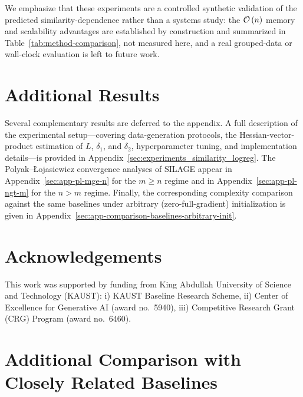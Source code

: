 \documentclass{article}
\newcommand{\cO}{{\cal O}}
\newcommand{\rb}[1]{\left(#1\right)}
\theoremstyle{plain}
\newcommand{\algname}[1]{{\sf\scalefont{0.88}\color{mydarkgreen}#1}\xspace}
\def\algname#1{#1}%
\begin{document}
We emphasize that these experiments are a controlled synthetic validation of the predicted similarity-dependence rather than a systems study: the $\cO\rb{n}$ memory and scalability advantages are established by construction and summarized in Table~\ref{tab:method-comparison}, not measured here, and a real grouped-data or wall-clock evaluation is left to future work.

\section{Additional Results}\label{sec:additional-results}

Several complementary results are deferred to the appendix. A full description of the experimental setup---covering data-generation protocols, the Hessian-vector-product estimation of $L$, $\delta_1$, and $\delta_2$, hyperparameter tuning, and implementation details---is provided in Appendix~\ref{sec:experiments_similarity_logreg}. The Polyak--\L{}ojasiewicz convergence analyses of \algname{SILAGE} appear in Appendix~\ref{sec:app-pl-mge-n} for the $m\ge n$ regime and in Appendix~\ref{sec:app-pl-ngt-m} for the $n>m$ regime. Finally, the corresponding complexity comparison against the same baselines under arbitrary (zero-full-gradient) initialization is given in Appendix~\ref{sec:app-comparison-baselines-arbitrary-init}.

\section*{Acknowledgements}
This work was supported by funding from King Abdullah University of Science and Technology (KAUST): i) KAUST Baseline Research Scheme,
ii) Center of Excellence for Generative AI (award no.\ 5940),
iii) Competitive Research Grant (CRG) Program (award no.\ 6460).



%
%


% 

\appendix

\newpage

\tableofcontents

\newpage

\section{Additional Comparison with Closely Related Baselines}
\label{sec:app-comparison-baselines-arbitrary}
\end{document}

